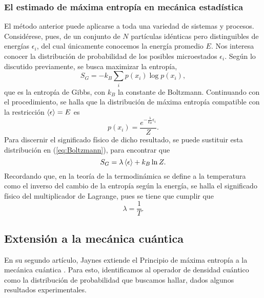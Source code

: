 \subsubsection{El estimado de máxima entropía en mecánica estadística}

El método anterior puede aplicarse a toda una variedad de sistemas y procesos. Considérese, pues, de un conjunto de $N$ partículas idénticas pero distinguibles de energías $\epsilon_{i}$, del cual únicamente conocemos la energía promedio $E$. Nos interesa conocer la distribución de probabilidad de los posibles microestados $\epsilon_{i}$. Según lo discutido previamente, se busca maximizar la entropía,
\begin{equation}\label{eq:GibbsEntropy}
    S_{G}=-k_{B}\sum_{i}p(x_{i})\log{p(x_{i})},
\end{equation}
que es la entropía de Gibbs, con $k_{B}$ la constante de Boltzmann. Continuando con el procedimiento, se halla que la distribución de máxima entropía compatible con la restricción $\expval{\epsilon}=E$ es
\begin{equation}\label{eq:Boltzmann}
    p(x_{i})=\frac{e^{-\frac{\lambda}{k_{B}}\epsilon_{i}}}{Z}.
\end{equation}
Para discernir el significado físico de dicho resultado, se puede sustituir esta distribución en (\ref{eq:Boltzmann}), para encontrar que
\begin{equation}
    S_{G}=\lambda\expval{\epsilon}+k_{B}\ln{Z}.
\end{equation}
Recordando que, en la teoría de la termodinámica se define a la temperatura como el inverso del cambio de la entropía según la energía, se halla el significado físico del multiplicador de Lagrange, pues se tiene que cumplir que
\begin{equation*}
    \lambda=\frac{1}{T}.
\end{equation*}
\subsection{Extensión a la mecánica cuántica}

En su segundo artículo, Jaynes extiende el Principio de máxima entropía a la mecánica cuántica \cite{JaynesII}. Para esto, identificamos al operador de densidad cuántico como la distribución de probabilidad que buscamos hallar, dados algunos resultados experimentales.

